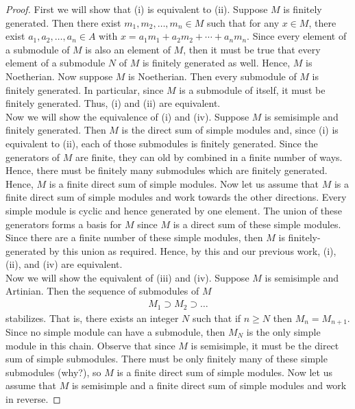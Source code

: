 \documentclass[11pt, reqno]{amsart}
\theoremstyle{plain}
\theoremstyle{definition}
\theoremstyle{example}
\begin{document}
\begin{proof}
First we will show that (i) is equivalent to (ii). Suppose $M$ is finitely generated. Then there exist $m_1, m_2, \ldots, m_n \in M$ such that for any $x \in M$, there exist $a_1, a_2, \ldots, a_n \in A$ with $x = a_1m_1 + a_2m_2 + \cdots + a_nm_n$. Since every element of a submodule of $M$ is also an element of $M$, then it must be true that every element of a submodule $N$ of $M$ is finitely generated as well. Hence, $M$ is Noetherian. Now suppose $M$ is Noetherian. Then every submodule of $M$ is finitely generated. In particular, since $M$ is a submodule of itself, it must be finitely generated. Thus, (i) and (ii) are equivalent.\\

Now we will show the equivalence of (i) and (iv). Suppose $M$ is semisimple and finitely generated. Then $M$ is the direct sum of simple modules and, since (i) is equivalent to (ii), each of those submodules is finitely generated. Since the generators of $M$ are finite, they can old by combined in a finite number of ways. Hence, there must be finitely many submodules which are finitely generated. Hence, $M$ is a finite direct sum of simple modules. Now let us assume that $M$ is a finite direct sum of simple modules and work towards the other directions. Every simple module is cyclic and hence generated by one element. The union of these generators forms a basis for $M$ since $M$ is a direct sum of these simple modules. Since there are a finite number of these simple modules, then $M$ is finitely-generated by this union as required. Hence, by this and our previous work, (i), (ii), and (iv) are equivalent.\\

Now we will show the equivalent of (iii) and (iv). Suppose $M$ is semisimple and Artinian. Then the sequence of submodules of $M$
\begin{align*}
M_1 \supset M_2 \supset \ldots
\end{align*}
stabilizes. That is, there exists an integer $N$ such that if $n \geq N$ then $M_n = M_{n+1}$. Since no simple module can have a submodule, then $M_N$ is the only simple module in this chain. Observe that since $M$ is semisimple, it must be the direct sum of simple submodules. There must be only finitely many of these simple submodules (why?), so $M$ is a finite direct sum of simple modules. Now let us assume that $M$ is semisimple and a finite direct sum of simple modules and work in reverse.
\end{proof}
\end{document}
